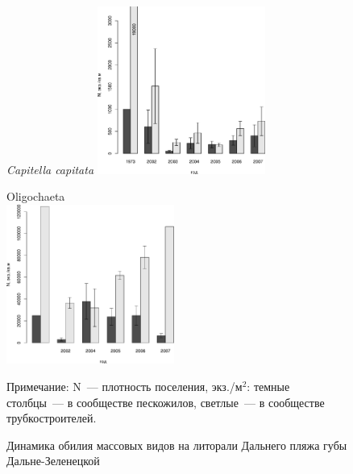 \begin{figure}[hp]
\begin{minipage}[b]{.46\linewidth}
\begin{center}
	\end{center}
	\end{minipage}
	\hfil %
	\begin{minipage}[b]{.46\linewidth}
	\begin{center}	
	{\footnotesize \textit{Capitella capitata}}
	\includegraphics[width=55mm]{../after_Deryuginskie/2_disser/Capitella_N_dynamic1.pdf}
	\end{center}
	\end{minipage}
	\begin{minipage}[b]{.46\linewidth}
	\begin{center}
	{\footnotesize Oligochaeta}\\
	\includegraphics[width=55mm]{../after_Deryuginskie/2_disser/Oligochaeta_N_dynamic1.pdf}
	\end{center}
	\end{minipage}
	\hfil %
	\begin{minipage}[b]{.46\linewidth}
	\end{minipage}
\caption{Динамика обилия массовых видов на литорали Дальнего пляжа губы Дальне-Зеленецкой}
\label{ris:DZ_N_dynamic_dominants}

{\footnotesize Примечание: N~--- плотность поселения, экз./м$^2$: темные столбцы~--- в сообществе пескожилов, светлые~--- в сообществе трубкостроителей.}
\end{figure}
